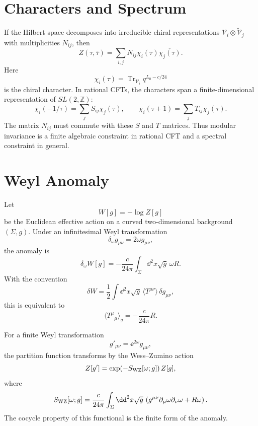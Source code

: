 \section{Characters and Spectrum}

If the Hilbert space decomposes into irreducible chiral representations
\(\mathcal V_i\otimes\widetilde{\mathcal V}_j\) with multiplicities
\(N_{ij}\), then
\[
  Z(\tau,\bar\tau)
  =
  \sum_{i,j}N_{ij}\chi_i(\tau)\overline{\chi_j(\tau)}.
\]
Here
\[
  \chi_i(\tau)
  =
  \operatorname{Tr}_{\mathcal V_i}
  q^{L_0-c/24}
\]
is the chiral character.  In rational CFTs, the characters span a
finite-dimensional representation of \(SL(2,\mathbb Z)\):
\[
  \chi_i(-1/\tau)=\sum_j S_{ij}\chi_j(\tau),
  \qquad
  \chi_i(\tau+1)=\sum_j T_{ij}\chi_j(\tau).
\]
The matrix \(N_{ij}\) must commute with these \(S\) and \(T\) matrices.  Thus
modular invariance is a finite algebraic constraint in rational CFT and a
spectral constraint in general.

\section{Weyl Anomaly}

Let
\[
  W[g]=-\log Z[g]
\]
be the Euclidean effective action on a curved two-dimensional background
\((\Sigma,g)\).  Under an infinitesimal Weyl transformation
\[
  \delta_\omega g_{\mu\nu}=2\omega g_{\mu\nu},
\]
the anomaly is
\begin{equation}
  \delta_\omega W[g]
  =
  -\frac{c}{24\pi}
  \int_\Sigma\dd^2x\sqrt g\,\omega R.
  \label{eq:weyl-anomaly-variation}
\end{equation}
With the convention
\[
  \delta W
  =
  \frac12
  \int\dd^2x\sqrt g\,
  \langle T^{\mu\nu}\rangle\,\delta g_{\mu\nu},
\]
this is equivalent to
\begin{equation}
  \langle T^\mu{}_\mu\rangle_g
  =
  -\frac{c}{24\pi}R.
  \label{eq:trace-anomaly-2d}
\end{equation}

For a finite Weyl transformation
\[
  g'_{\mu\nu}=\ee^{2\omega}g_{\mu\nu},
\]
the partition function transforms by the Wess--Zumino action
\begin{equation}
  Z[g']
  =
  \exp\!\left(-S_{\rm WZ}[\omega;g]\right)Z[g],
  \label{eq:finite-weyl-transform-partition}
\end{equation}
where
\begin{equation}
  S_{\rm WZ}[\omega;g]
  =
  \frac{c}{24\pi}
  \int_\Sigma\dd^2x\sqrt g\,
  \left(
    g^{\mu\nu}\partial_\mu\omega\partial_\nu\omega
    +
    R\omega
  \right).
  \label{eq:wess-zumino-weyl-action}
\end{equation}
The cocycle property of this functional is the finite form of the anomaly.

